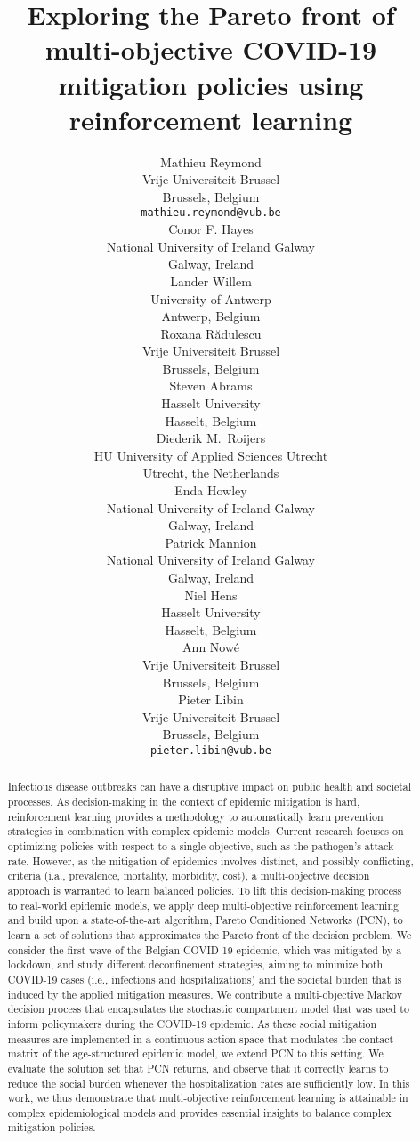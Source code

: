 \documentclass{article}
\title{Exploring the Pareto front of multi-objective COVID-19 mitigation policies using reinforcement learning}
\date{}
\author{Mathieu Reymond \\
	Vrije Universiteit Brussel\\
	Brussels, Belgium \\
	\texttt{mathieu.reymond@vub.be} \\
	\And
	Conor F. Hayes \\
	National University of Ireland Galway\\
	Galway, Ireland\\
	\And
	Lander Willem \\
	University of Antwerp \\
	Antwerp, Belgium \\
	\And
	Roxana R\u{a}dulescu \\
	Vrije Universiteit Brussel\\
	Brussels, Belgium \\
	\And
	Steven Abrams \\
	Hasselt University \\
	Hasselt, Belgium \\
	\And
	Diederik M.\ Roijers \\
	HU University of Applied Sciences Utrecht \\
	Utrecht, the Netherlands \\
	\And
	Enda Howley \\
	National University of Ireland Galway\\
	Galway, Ireland\\
	\And
	Patrick Mannion \\
	National University of Ireland Galway\\
	Galway, Ireland\\
	\And
	Niel Hens \\
	Hasselt University \\
	Hasselt, Belgium \\
	\And
	Ann Now\'{e} \\
	Vrije Universiteit Brussel\\
	Brussels, Belgium \\
	\And
	Pieter Libin \\
	Vrije Universiteit Brussel\\
	Brussels, Belgium \\
    \texttt{pieter.libin@vub.be} \\
}
\begin{document}
\maketitle

\begin{abstract}
Infectious disease outbreaks can have a disruptive impact on public health and societal processes. As decision-making in the context of epidemic mitigation is hard, reinforcement learning provides a methodology to automatically learn prevention strategies in combination with complex epidemic models. Current research focuses on optimizing policies with respect to a single objective, such as the pathogen's attack rate. However, as the mitigation of epidemics involves distinct, and possibly conflicting, criteria (i.a., prevalence, mortality, morbidity, cost), a multi-objective decision approach is warranted to learn balanced policies. To lift this decision-making process to real-world epidemic models, we apply deep multi-objective reinforcement learning and build upon a state-of-the-art algorithm, Pareto Conditioned Networks (PCN), to learn a set of solutions that approximates the Pareto front of the decision problem. We consider the first wave of the Belgian COVID-19 epidemic, which was mitigated by a lockdown, and study different deconfinement strategies, aiming to minimize both COVID-19 cases (i.e., infections and hospitalizations) and the societal burden that is induced by the applied mitigation measures. We contribute a multi-objective Markov decision process that encapsulates the stochastic compartment model that was used to inform policymakers during the COVID-19 epidemic. As these social mitigation measures are implemented in a continuous action space that modulates the contact matrix of the age-structured epidemic model, we extend PCN to this setting. We evaluate the solution set that PCN returns, and observe that it correctly learns to reduce the social burden whenever the hospitalization rates are sufficiently low. In this work, we thus demonstrate that multi-objective reinforcement learning is attainable in complex epidemiological models and provides essential insights to balance complex mitigation policies.
\end{abstract}



\end{document}
